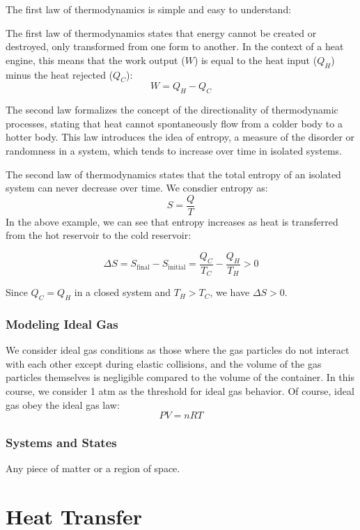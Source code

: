 \documentclass[11pt]{report}
\begin{document}
The first law of thermodynamics is simple and easy to understand:
\begin{definition}
    The first law of thermodynamics states that energy cannot be created or destroyed, only transformed from one form to another. In the context of a heat engine, this means that the work output ($W$) is equal to the heat input ($Q_H$) minus the heat rejected ($Q_C$):
    \begin{equation}
        W = Q_H - Q_C
    \end{equation}
\end{definition}
The second law formalizes the concept of the directionality of thermodynamic processes, stating that heat cannot spontaneously flow from a colder body to a hotter body. This law introduces the idea of entropy, a measure of the disorder or randomness in a system, which tends to increase over time in isolated systems.

\begin{definition}
    The second law of thermodynamics states that the total entropy of an isolated system can never decrease over time. We consdier entropy as:
    \begin{equation}
        S = \frac{Q}{T}
    \end{equation}
    In the above example, we can see that entropy increases as heat is transferred from the hot reservoir to the cold reservoir:

    $$
        \Delta S = S_{\text{final}} - S_{\text{initial}} = \frac{Q_C}{T_C} - \frac{Q_H}{T_H} > 0
    $$

    Since $Q_C = Q_H$ in a closed system and $T_H > T_C$, we have $\Delta S > 0$.
\end{definition}

\subsection{Modeling Ideal Gas}
\begin{definition}
    We consider ideal gas conditions as those where the gas particles do not interact with each other except during elastic collisions, and the volume of the gas particles themselves is negligible compared to the volume of the container. In this course, we consider 1 atm as the threshold for ideal gas behavior. Of course, ideal gas obey the ideal gas law:
    \begin{equation}
        PV = nRT
    \end{equation}
\end{definition}

\subsection{Systems and States}
\begin{definition}[System]
    Any piece of matter or a region of space.
\end{definition}


\chapter{Heat Transfer}
\end{document}
